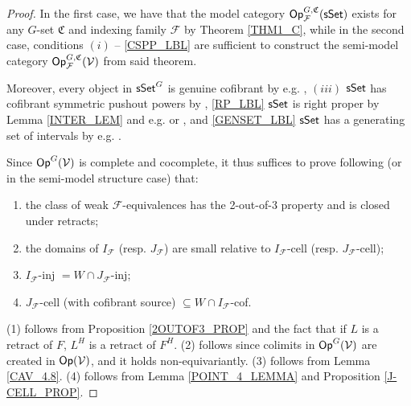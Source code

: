 \documentclass[a4paper,10pt
,draft
]{article}%
\renewcommand{\F}{\mathcal F}
\renewcommand{\1}{\eta}%
\begin{document}
\begin{proof}
      In the first case, we have that the model category $\Op^{G,\mathfrak C}_\F(\sSet)$ exists
      for any $G$-set $\mathfrak C$ and indexing family $\F$ by Theorem \ref{THM1_C},
      while in the second case, conditions $(i)$ -- \ref{CSPP_LBL} are sufficient to construct the
      semi-model category $\Op^{G, \mathfrak C}_\F(\V)$ from said theorem.
      
      Moreover,
      every object in $\mathsf{sSet}^G$ is genuine cofibrant by e.g. \cite[Remark 5.71]{BP_geo},
      $(iii)$ $\mathsf{sSet}$ has cofibrant symmetric pushout powers by \cite[Remark 6.18]{BP_geo},
      \ref{RP_LBL} $\mathsf{sSet}$ is right proper
      by Lemma \ref{INTER_LEM} and e.g. \cite[Prop 2.1.5]{Cis06} or \cite[Lemma 1.12]{BM13}, and
      \ref{GENSET_LBL} $\mathsf{sSet}$ has a generating set of intervals
      by e.g. \cite[Lemma 1.12]{BM13}.

      Since $\mathsf{Op}^G(\mathcal V)$ is complete and cocomplete, it thus suffices to prove
      following \cite[Theorem 2.1.19]{Hov} (or \cite[Theorem 2.2.2]{WY} in the semi-model structure case) that:
      \begin{enumerate}[label = (\arabic*)]
      \item the class of weak $\F$-equivalences has the 2-out-of-3 property and is closed under retracts;
      \item the domains of $I_{\F}$ (resp. $J_{\F}$) are small relative to $I_{\F}$-cell (resp. $J_{\F}$-cell);
      \item $I_{\F}$-inj $= W\cap J_{\F}$-inj;
      \item $J_{\F}$-cell (with cofibrant source) $\subseteq W\cap I_{\F}$-cof.
      \end{enumerate}
      (1) follows from Proposition \ref{2OUTOF3_PROP} and the fact that if $L$ is a retract of $F$, $L^H$ is a retract of $F^H$.
      (2) follows since colimits in $\mathsf{Op}^G(\mathcal V)$ are created in $\mathsf{Op}(\mathcal V)$, and it holds non-equivariantly.
      (3) follows from Lemma \ref{CAV_4.8}.
      (4) follows from Lemma \ref{POINT_4_LEMMA} and Proposition \ref{J-CELL_PROP}.
\end{proof}
\end{document}
